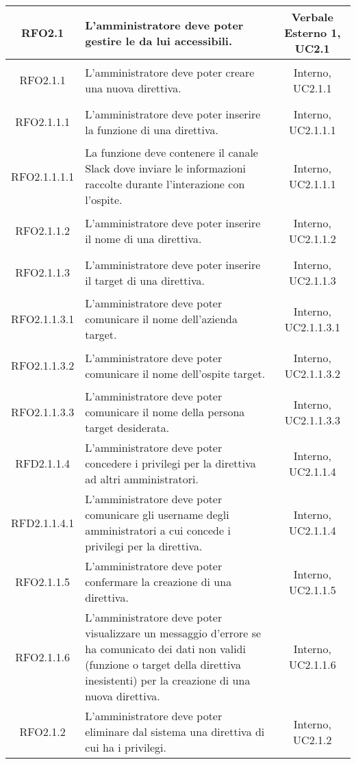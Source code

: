 \begin{longtable}{|c|>{\centering}m{7cm}|c|}
	\hypertarget{RFO2.1}{RFO2.1} & L'amministratore deve poter gestire le \gl{direttive} da lui accessibili. & Verbale Esterno 1, UC2.1\\ \hline
	\hypertarget{RFO2.1.1}{RFO2.1.1} & L'amministratore deve poter creare una nuova direttiva. & Interno, UC2.1.1\\ \hline
	\hypertarget{RFO2.1.1.1}{RFO2.1.1.1} & L'amministratore deve poter inserire la funzione di una direttiva. & Interno, UC2.1.1.1\\ \hline
	\hypertarget{RFO2.1.1.1.1}{RFO2.1.1.1.1} & La funzione deve contenere il canale Slack dove inviare le informazioni raccolte durante l'interazione con l'ospite. & Interno, UC2.1.1.1\\ \hline
	\hypertarget{RFO2.1.1.2}{RFO2.1.1.2} & L'amministratore deve poter inserire il nome di una direttiva. & Interno, UC2.1.1.2\\ \hline
	\hypertarget{RFO2.1.1.3}{RFO2.1.1.3} & L'amministratore deve poter inserire il target di una direttiva. & Interno, UC2.1.1.3\\ \hline
	\hypertarget{RFO2.1.1.3.1}{RFO2.1.1.3.1} & L'amministratore deve poter comunicare il nome dell'azienda target. & Interno, UC2.1.1.3.1\\ \hline
	\hypertarget{RFO2.1.1.3.2}{RFO2.1.1.3.2} & L'amministratore deve poter comunicare il nome dell'ospite target. & Interno, UC2.1.1.3.2\\ \hline
	\hypertarget{RFO2.1.1.3.3}{RFO2.1.1.3.3} & L'amministratore deve poter comunicare il nome della persona target desiderata. & Interno, UC2.1.1.3.3\\ \hline
	\hypertarget{RFD2.1.1.4}{RFD2.1.1.4} & L'amministratore deve poter concedere i privilegi per la direttiva ad altri amministratori. & Interno, UC2.1.1.4\\ \hline
	\hypertarget{RFD2.1.1.4.1}{RFD2.1.1.4.1} & L'amministratore deve poter comunicare gli username degli amministratori a cui concede i privilegi per la direttiva. & Interno, UC2.1.1.4\\ \hline
	\hypertarget{RFO2.1.1.5}{RFO2.1.1.5} & L'amministratore deve poter confermare la creazione di una direttiva. & Interno, UC2.1.1.5\\ \hline
	\hypertarget{RFO2.1.1.6}{RFO2.1.1.6} & L'amministratore deve poter visualizzare un messaggio d'errore se ha comunicato dei dati non validi (funzione o target della direttiva inesistenti) per la creazione di una nuova direttiva. & Interno, UC2.1.1.6\\ \hline
	\hypertarget{RFO2.1.2}{RFO2.1.2} & L'amministratore deve poter eliminare dal sistema una direttiva di cui ha i privilegi. & Interno, UC2.1.2\\ \hline

\end{longtable}
